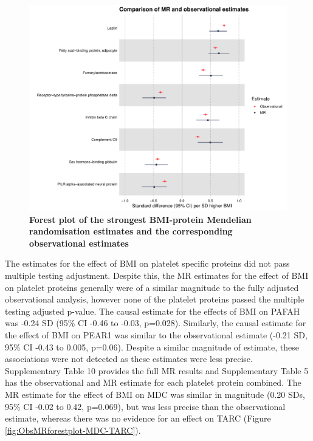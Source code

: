 \documentclass[11pt,twoside]{bristolthesis}
\begin{document}
\begin{figure}
\includegraphics[width=0.9\linewidth]{figure/BMI_protein_INTERVAL/MR_obs_compar_forestplot} \caption[Forest plot of the strongest BMI-protein Mendelian randomisation estimates and the corresponding observational estimates]{\textbf{Forest plot of the strongest BMI-protein Mendelian randomisation estimates and the corresponding observational estimates}}\label{fig:ObsMRforestplot2}
\end{figure}
The estimates for the effect of BMI on platelet specific proteins did not pass multiple testing adjustment. Despite this, the MR estimates for the effect of BMI on platelet proteins generally were of a similar magnitude to the fully adjusted observational analysis, however none of the platelet proteins passed the multiple testing adjusted p-value. The causal estimate for the effects of BMI on PAFAH was -0.24 SD (95\% CI -0.46 to -0.03, p=0.028). Similarly, the causal estimate for the effect of BMI on PEAR1 was similar to the observational estimate (-0.21 SD, 95\% CI -0.43 to 0.005, p=0.06). Despite a similar magnitude of estimate, these associations were not detected as these estimates were less precise. Supplementary Table 10 provides the full MR results and Supplementary Table 5 has the observational and MR estimate for each platelet protein combined. The MR estimate for the effect of BMI on MDC was similar in magnitude (0.20 SDs, 95\% CI -0.02 to 0.42, p=0.069), but was less precise than the observational estimate, whereas there was no evidence for an effect on TARC (Figure \ref{fig:ObsMRforestplot-MDC-TARC}).
\end{document}
